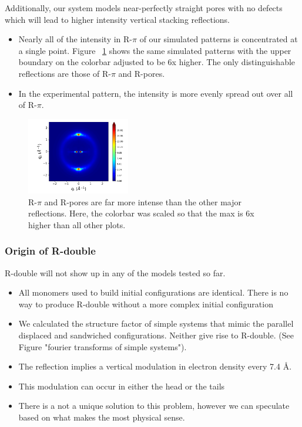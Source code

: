 \documentclass{article}
\begin{document}
  Additionally, our system models near-perfectly straight pores with no defects which will
  lead to higher intensity vertical stacking reflections. 
  \begin{itemize}
  		\item Nearly all of the intensity in R-$\pi$ of our simulated patterns is concentrated
  		at a single point. Figure ~\ref{fig:intense_rpi} shows the same simulated patterns with
  		the upper boundary on the colorbar adjusted to be 6x higher. The only distinguishable 
  		reflections are	those of R-$\pi$ and R-pores.
  		\item In the experimental pattern, the intensity is more evenly spread out over all
  		of R-$\pi$. 
  \end{itemize}
  
  \begin{figure}
  \centering
  \includegraphics[width=0.4\textwidth]{sandwich_rzplot_highlimit_cbar.png}
  \caption{R-$\pi$ and R-pores are far more intense than the other major reflections. Here, the 
  colorbar was scaled so that the max is 6x higher than all other plots.}\label{fig:intense_rpi}
  \end{figure}
  
  \subsubsection{Origin of R-double}\label{section:rdouble}
  
  R-double will not show up in any of the models tested so far.
  \begin{itemize}
        \item All monomers used to build initial configurations are identical. There is no way 	
        to produce R-double without a more complex initial configuration 
        \item We calculated the structure factor of simple systems that mimic the parallel
        displaced and sandwiched configurations. Neither give rise to R-double.
        (See Figure "fourier transforms of simple systems").
        \item The reflection implies a vertical modulation in electron density every 7.4 \AA.                
        \item This modulation can occur in either the head or the tails
        \item There is a not a unique solution to this problem, however we can speculate based
        on what makes the most physical sense.
  \end{itemize}
  
\end{document}
